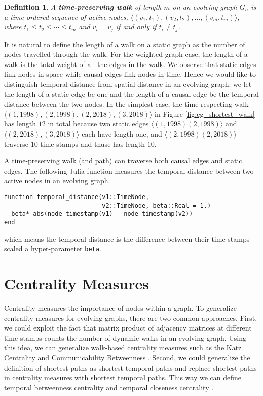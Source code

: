 \documentclass[12pt]{article}
\newtheorem{definition}{Definition}
\theoremstyle{definition}
\begin{document}
\begin{definition}
A \textbf{time-preserving walk}  of length $m$ on an evolving graph $G_n$ is a time-ordered sequence of active nodes, $\langle (v_1, t_1), (v_2, t_2), \ldots, (v_m, t_m) \rangle$, where $t_1 \le t_2 \le \cdots \le t_m$ and
$v_i = v_j$ if and only if $t_i \ne t_j$.
\end{definition}

It is natural to define the length of a walk on a static graph as the number of nodes travelled through the walk. For the weighted graph case, the length of a walk is the total weight of all the edges in the walk. We observe that static edges link nodes in space while causal edges link nodes in time. Hence we would like to distinguish temporal distance from spatial distance in an evolving graph: we let the length of a static edge be one and the length of a causal edge be the temporal distance between the two nodes. In the simplest case, the time-respecting walk
$\langle (1, 1998) ,(2, 1998) , (2, 2018), (3, 2018)\rangle$ in Figure \ref{fig:eg_shortest_walk} has length $12$ in total because two static edges $\langle (1, 1998) (2, 1998) \rangle$ and $\langle (2, 2018), (3, 2018) \rangle$ each have length one, and $\langle (2, 1998) (2, 2018) \rangle$
traverse $10$ time stamps and thuse has length $10$.

A time-preserving walk (and path) can traverse both causal edges and static edges.
The following Julia function measures the temporal distance between two active nodes in an evolving graph.

\begin{lstlisting}
function temporal_distance(v1::TimeNode,
                           v2::TimeNode, beta::Real = 1.)
  beta* abs(node_timestamp(v1) - node_timestamp(v2))
end
\end{lstlisting}
which means the temporal distance is the difference between their time stamps scaled a hyper-parameter
\texttt{beta}.

\section{Centrality Measures}
\label{sec:topol-temp-flow}

Centrality measures the importance of nodes within a graph.
To generalize centrality measures for evolving graphs, there are two common approaches.
First, we could exploit the fact that matrix product of adjacency matrices at different time stamps counts the number of dynamic walks in an evolving graph. Using this idea, we can generalize walk-based centrality measures such as
the Katz Centrality \cite{estrada09} and Communicability Betweenness \cite{alsayed15}.
Second, we could generalize the definition of shortest paths as shortest temporal paths and replace shortest paths in centrality measures with shortest temporal paths. This way we can define temporal betweenness centrality and temporal closeness centrality \cite{nicosia13}.
\end{document}
